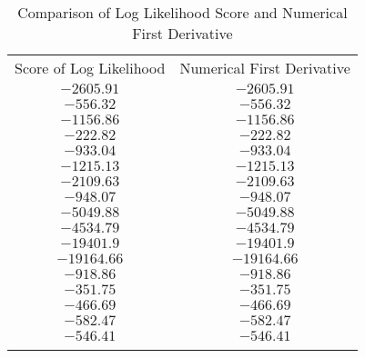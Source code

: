 \begin{table}[!t]
    \centering \small
    \caption{Comparison of Log Likelihood Score and Numerical First Derivative}
    \begin{tabular}{cc}
    \par \toprule
    Score of Log Likelihood & Numerical First Derivative\\
    \par \midrule
	$-2605.91$ & $-2605.91$\\
	$-556.32$ & $-556.32$\\
	$-1156.86$ & $-1156.86$\\
	$-222.82$ & $-222.82$\\
	$-933.04$ & $-933.04$\\
	$-1215.13$ & $-1215.13$\\
	$-2109.63$ & $-2109.63$\\
	$-948.07$ & $-948.07$\\
	$-5049.88$ & $-5049.88$\\
	$-4534.79$ & $-4534.79$\\
	$-19401.9$ & $-19401.9$\\
	$-19164.66$ & $-19164.66$\\
	$-918.86$ & $-918.86$\\
	$-351.75$ & $-351.75$\\
	$-466.69$ & $-466.69$\\
	$-582.47$ & $-582.47$\\
	$-546.41$ & $-546.41$\\
    \par \toprule
    \end{tabular}
    \label{tab2}
\end{table}